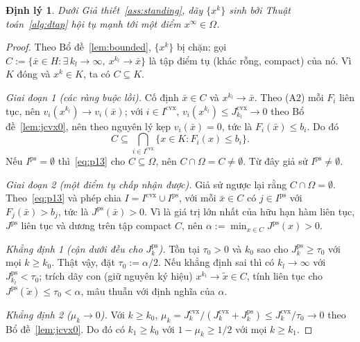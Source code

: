 \documentclass[]{interact}
\theoremstyle{plain}
\newtheorem{theorem}{Định lý}[section]
\theoremstyle{definition}
\theoremstyle{remark}
\newcommand{\cvx}{\mathrm{cvx}}
\newcommand{\ps}{\mathrm{ps}}
\begin{document}
\begin{theorem}\label{thm:strong}
Dưới Giả thiết~\ref{ass:standing}, dãy $\{x^k\}$ sinh bởi
Thuật toán~\ref{alg:dtap} hội tụ mạnh tới một điểm $x^\infty\in\Omega$.
\end{theorem}
\begin{proof}
Theo Bổ đề~\ref{lem:bounded}, $\{x^k\}$ bị chặn; gọi
$C:=\{\bar x\in H:\exists\,k_l\to\infty,\ x^{k_l}\to\bar x\}$ là tập điểm tụ (khác rỗng, compact)
của nó. Vì $K$ đóng và $x^k\in K$, ta có $C\subseteq K$.

\emph{Giai đoạn 1 (các ràng buộc lồi).} Cố định $\bar x\in C$ và $x^{k_l}\to\bar x$. Theo (A2) mỗi
$F_i$ liên tục, nên $v_i(x^{k_l})\to v_i(\bar x)$; với $i\in I^{\cvx}$,
$v_i(x^{k_l})\le J^{\cvx}_{k_l}\to0$ theo Bổ đề~\ref{lem:jcvx0}, nên theo nguyên lý kẹp
$v_i(\bar x)=0$, tức là $F_i(\bar x)\le b_i$. Do đó
\begin{equation}\label{eq:p13}
C\subseteq\bigcap_{i\in I^{\cvx}}\{x\in K:F_i(x)\le b_i\}.
\end{equation}
Nếu $I^{\ps}=\emptyset$ thì~\eqref{eq:p13} cho $C\subseteq\Omega$,
nên $C\cap\Omega=C\ne\emptyset$.
Từ đây giả sử $I^{\ps}\ne\emptyset$.

\emph{Giai đoạn 2 (một điểm tụ chấp nhận được).} Giả sử ngược lại rằng
$C\cap\Omega=\emptyset$. Theo~\eqref{eq:p13} và phép chia $I=I^{\cvx}\cup I^{\ps}$, với
mỗi $\bar x\in C$ có $j\in I^{\ps}$ với $F_j(\bar x)>b_j$, tức là
$J^{\ps}(\bar x)>0$. Vì là giá trị lớn nhất của hữu hạn hàm liên tục, $J^{\ps}$
liên tục và dương trên tập compact $C$, nên $\alpha:=\min_{x\in C}J^{\ps}(x)>0$.

\smallskip
\emph{Khẳng định 1 (cận dưới đều cho $J^{\ps}_k$).} Tồn tại $\tau_0>0$ và $k_0$
sao cho $J^{\ps}_k\ge\tau_0$ với mọi $k\ge k_0$. Thật vậy, đặt $\tau_0:=\alpha/2$. Nếu khẳng định
sai thì có $k_l\to\infty$ với $J^{\ps}_{k_l}<\tau_0$; trích dãy con (giữ nguyên
ký hiệu) $x^{k_l}\to\tilde x\in C$, tính liên tục cho $J^{\ps}(\tilde x)\le\tau_0<\alpha$,
mâu thuẫn với định nghĩa của $\alpha$.

\smallskip
\emph{Khẳng định 2 ($\mu_k\to0$).} Với $k\ge k_0$,
$\mu_k=J^{\cvx}_k/(J^{\cvx}_k+J^{\ps}_k)\le J^{\cvx}_k/\tau_0\to0$ theo
Bổ đề~\ref{lem:jcvx0}. Do đó có $k_1\ge k_0$ với $1-\mu_k\ge1/2$ với mọi $k\ge k_1$.


\end{proof}
\end{document}
